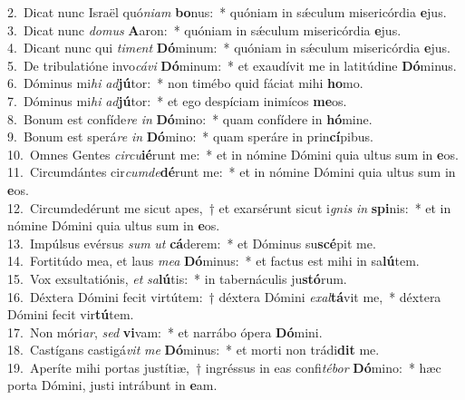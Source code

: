 {2.~}Dicat nunc Israël quó\textit{ni}\textit{am} \textbf{bo}nus:~* quóniam in sǽculum misericórdia \textbf{e}jus.\\
{3.~}Dicat nunc \textit{do}\textit{mus} \textbf{A}aron:~* quóniam in sǽculum misericórdia \textbf{e}jus.\\
{4.~}Dicant nunc qui \textit{ti}\textit{ment} \textbf{Dó}minum:~* quóniam in sǽculum misericórdia \textbf{e}jus.\\
{5.~}De tribulatióne invo\textit{cá}\textit{vi} \textbf{Dó}minum:~* et exaudívit me in latitúdine \textbf{Dó}minus.\\
{6.~}Dóminus mi\textit{hi} \textit{ad}\textbf{jú}tor:~* non timébo quid fáciat mihi \textbf{ho}mo.\\
{7.~}Dóminus mi\textit{hi} \textit{ad}\textbf{jú}tor:~* et ego despíciam inimícos \textbf{me}os.\\
{8.~}Bonum est confíde\textit{re} \textit{in} \textbf{Dó}mino:~* quam confídere in \textbf{hó}mine.\\
{9.~}Bonum est sperá\textit{re} \textit{in} \textbf{Dó}mino:~* quam speráre in prin\textbf{cí}pibus.\\
{10.~}Omnes Gentes \textit{cir}\textit{cu}\textbf{ié}runt me:~* et in nómine Dómini quia ultus sum in \textbf{e}os.\\
{11.~}Circumdántes cir\textit{cum}\textit{de}\textbf{dé}runt me:~* et in nómine Dómini quia ultus sum in \textbf{e}os.\\
{12.~}Circumdedérunt me sicut apes,~† et exarsérunt sicut i\textit{gnis} \textit{in} \textbf{spi}nis:~* et in nómine Dómini quia ultus sum in \textbf{e}os.\\
{13.~}Impúlsus evérsus \textit{sum} \textit{ut} \textbf{cá}derem:~* et Dóminus su\textbf{scé}pit me.\\
{14.~}Fortitúdo mea, et laus \textit{me}\textit{a} \textbf{Dó}minus:~* et factus est mihi in sa\textbf{lú}tem.\\
{15.~}Vox exsultatiónis, \textit{et} \textit{sa}\textbf{lú}tis:~* in tabernáculis ju\textbf{stó}rum.\\
{16.~}Déxtera Dómini fecit virtútem:~† déxtera Dómini \textit{e}\textit{xal}\textbf{tá}vit me,~* déxtera Dómini fecit vir\textbf{tú}tem.\\
{17.~}Non móri\textit{ar}, \textit{sed} \textbf{vi}vam:~* et narrábo ópera \textbf{Dó}mini.\\
{18.~}Castígans castigá\textit{vit} \textit{me} \textbf{Dó}minus:~* et morti non trádi\textbf{dit} me.\\
{19.~}Aperíte mihi portas justítiæ,~† ingréssus in eas confi\textit{té}\textit{bor} \textbf{Dó}mino:~* hæc porta Dómini, justi intrábunt in \textbf{e}am.\\
